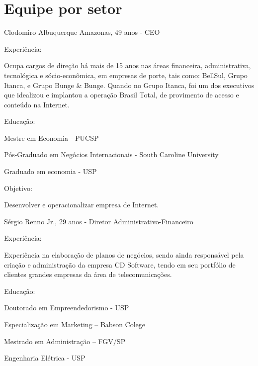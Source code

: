 \section{\textbf{Equipe por setor}}
\label{sec: Equipe por setor}


\begin{commentA}

\par \end{commentA}

Clodomiro Albuquerque Amazonas, 49 anos - CEO\par

\noindent Experiência:\par
Ocupa cargos de direção há mais de 15 anos nas áreas financeira,
administrativa, tecnológica e sócio-econômica, em empresas de porte, tais como: BellSul, Grupo Itanca, e Grupo Bunge \& Bunge. Quando no Grupo
Itanca, foi um dos executivos que idealizou e implantou a operação Brasil Total,
de provimento de acesso e conteúdo na Internet.\par

\noindent Educação:\par
\noindent Mestre em Economia - PUCSP\par
\noindent Pós-Graduado em Negócios Internacionais - South Caroline University\par
\noindent Graduado em economia - USP\par

\noindent Objetivo:\par
\noindent Desenvolver e operacionalizar empresa de Internet.\\ \par

Sérgio Renno Jr., 29 anos - Diretor Administrativo-Financeiro\par

\noindent Experiência:\par
Experiência na elaboração de planos de negócios, sendo ainda responsável pela criação e administração da empresa CD Software, tendo em seu portfólio de clientes grandes empresas da área de telecomunicações.\par

\noindent Educação:\par
\noindent Doutorado em Empreendedorismo - USP\par
\noindent Especialização em Marketing – Babson Colege\par
\noindent Mestrado em Administração – FGV/SP\par
\noindent Engenharia Elétrica - USP\par

